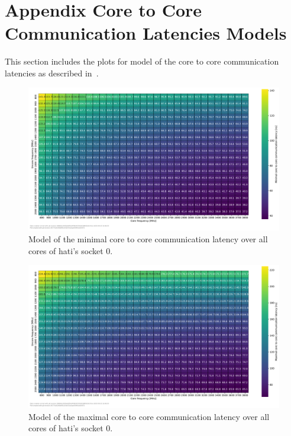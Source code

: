 \chapter{Appendix Core to Core Communication Latencies Models}
\label{app:core_to_core_latencies_model}
This section includes the plots for model of the core to core communication latencies as described in~.

\begin{figure}[]
    \centering
    \includegraphics[width=\columnwidth]{fig/core-to-core-latency/all-to-all-heatmap-model-min.pdf}
    \caption{Model of the minimal core to core communication latency over all cores of hati's socket 0.}
\end{figure}

\begin{figure}[]
    \centering
    \includegraphics[width=\columnwidth]{fig/core-to-core-latency/all-to-all-heatmap-model-max.pdf}
    \caption{Model of the maximal core to core communication latency over all cores of hati's socket 0.}
\end{figure}

